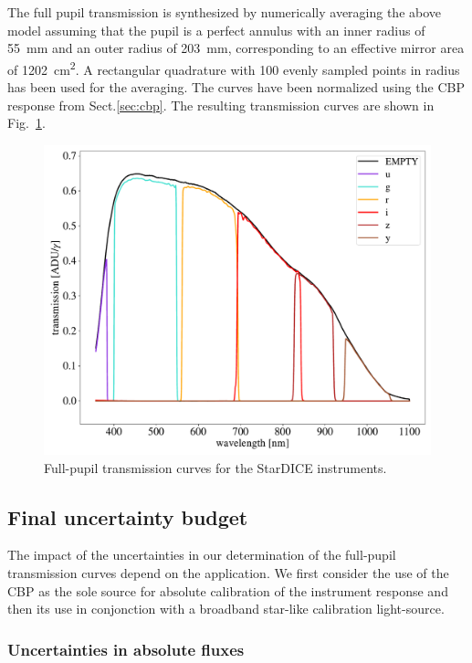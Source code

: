The full pupil transmission is synthesized by numerically averaging
the above model assuming that the pupil is a perfect annulus with an
inner radius of \SI{55}{mm} and an outer radius of \SI{203}{mm},
corresponding to an effective mirror area of \SI{1202}{cm^2}. A
rectangular quadrature with 100 evenly sampled points in radius has
been used for the averaging. The curves have been normalized using the
CBP response from Sect.\ref{sec:cbp}. The resulting transmission
curves are shown in Fig.~\ref{fig:fullpupiltrans}.
\begin{figure}
  \centering
  \includegraphics[width=1\linewidth]{fig/fullpupill.pdf}
  \caption{Full-pupil transmission curves for the StarDICE instruments.}
  \label{fig:fullpupiltrans}
\end{figure}


\subsection{Final uncertainty budget}

The impact of the uncertainties in our determination of the full-pupil
transmission curves depend on the application. We first consider the
use of the CBP as the sole source for absolute calibration of the
instrument response and then its use in conjonction with a broadband
star-like calibration light-source.

\subsubsection{Uncertainties in absolute fluxes}
\label{sec:absolute}

